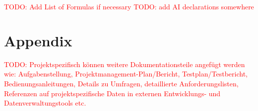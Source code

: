 \documentclass[a4paper,10.5pt,
			   bindingoffset=0.2in,left=3.35cm,right=2.12cm,top=3.75cm,bottom=2.88cm,%
				footskip=.25in
				listof=numbered,toc=chapterentrywithdots]{scrreport}
\renewcommand{\todo}[1]{\textcolor{red}{TODO: #1}}
\begin{document}
	\listoftables
	\todo{Add List of Formulas if necessary}
	\todo{add AI declarations somewhere}
	
	
	\chapter{\bibname}
	\printbibliography[heading=none]

	
	\appendix
	\chapter{Appendix}
		\todo{Projektspezifisch können weitere Dokumentationsteile angefügt werden wie: Aufgabenstellung, Projektmanagement-Plan/Bericht, Testplan/Testbericht, Bedienungsanleitungen, Details zu Umfragen, detaillierte Anforderungslisten, Referenzen auf projektspezifische Daten in externen Entwicklungs- und Datenverwaltungstools etc.}
	
\end{document}
